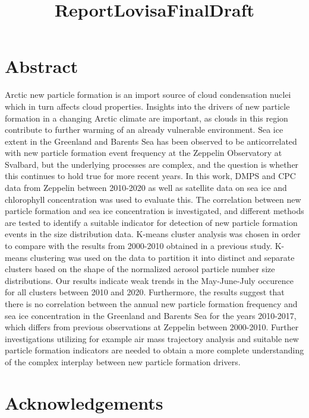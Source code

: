 \documentclass[11pt]{article}
\title{ReportLovisaFinalDraft}
\begin{document}
    
    \maketitle
    
    

    
    \hypertarget{abstract}{%
\section{Abstract}\label{abstract}}

Arctic new particle formation is an import source of cloud condensation
nuclei which in turn affects cloud properties. Insights into the drivers
of new particle formation in a changing Arctic climate are important, as
clouds in this region contribute to further warming of an already
vulnerable environment. Sea ice extent in the Greenland and Barents Sea
has been observed to be anticorrelated with new particle formation event
frequency at the Zeppelin Observatory at Svalbard, but the underlying
processes are complex, and the question is whether this continues to
hold true for more recent years. In this work, DMPS and CPC data from
Zeppelin between 2010-2020 as well as satellite data on sea ice and
chlorophyll concentration was used to evaluate this. The correlation
between new particle formation and sea ice concentration is
investigated, and different methods are tested to identify a suitable
indicator for detection of new particle formation events in the size
distribution data. K-means cluster analysis was chosen in order to
compare with the results from 2000-2010 obtained in a previous study.
K-means clustering was used on the data to partition it into distinct
and separate clusters based on the shape of the normalized aerosol
particle number size distributions. Our results indicate weak trends in
the May-June-July occurence for all clusters between 2010 and 2020.
Furthermore, the results suggest that there is no correlation between
the annual new particle formation frequency and sea ice concentration in
the Greenland and Barents Sea for the years 2010-2017, which differs
from previous observations at Zeppelin between 2000-2010. Further
investigations utilizing for example air mass trajectory analysis and
suitable new particle formation indicators are needed to obtain a more
complete understanding of the complex interplay between new particle
formation drivers.

    \hypertarget{acknowledgements}{%
\section{Acknowledgements}\label{acknowledgements}}
\end{document}
